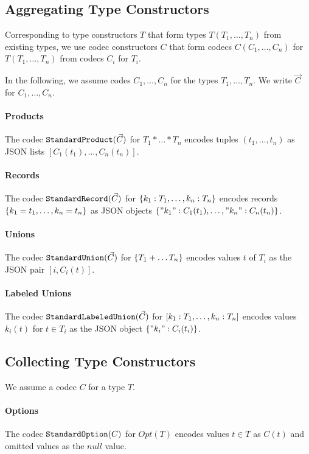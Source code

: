\subsection{Aggregating Type Constructors}

Corresponding to type constructors $T$ that form types $T(T_1,\ldots,T_n)$ from existing types, we use codec constructors $C$ that form codecs $C(C_1,\ldots,C_n)$ for $T(T_1,\ldots,T_n)$ from codecs $C_i$ for $T_i$.

In the following, we assume codes $C_1,\ldots,C_n$ for the types $T_1,\ldots,T_n$.
We write $\vec{C}$ for $C_1,\ldots,C_n$.

\paragraph{Products}
The codec $\cn{StandardProduct}(\vec{C})$ for $T_1*\ldots*T_n$ encodes tuples $(t_1,\ldots,t_n)$ as JSON lists $[C_1(t_1),\ldots,C_n(t_n)]$.

\paragraph{Records}
The codec $\cn{StandardRecord}(\vec{C})$ for $\record{k_1:T_1,\ldots,k_n:T_n}$ encodes records $\record{k_1=t_1,\ldots,k_n=t_n}$ as JSON objects $\jobj{"k_1":C_1(t_1),\ldots,"k_n":C_n(t_n)}$.

\paragraph{Unions}
The codec $\cn{StandardUnion}(\vec{C})$ for $\record{T_1+\ldots T_n}$ encodes values $t$ of $T_i$ as the JSON pair $[i,C_i(t)]$.

\paragraph{Labeled Unions}
The codec $\cn{StandardLabeledUnion}(\vec{C})$ for $\union{k_1:T_1,\ldots,k_n:T_n}$ encodes values $k_i(t)$ for $t\in T_i$ as the JSON object $\jobj{"k_i":C_i(t_i)}$.

\subsection{Collecting Type Constructors}

We assume a codec $C$ for a type $T$.

\paragraph{Options}
The codec $\cn{StandardOption}(C)$ for $Opt(T)$ encodes values $t\in T$ as $C(t)$ and omitted values as the $null$ value.


